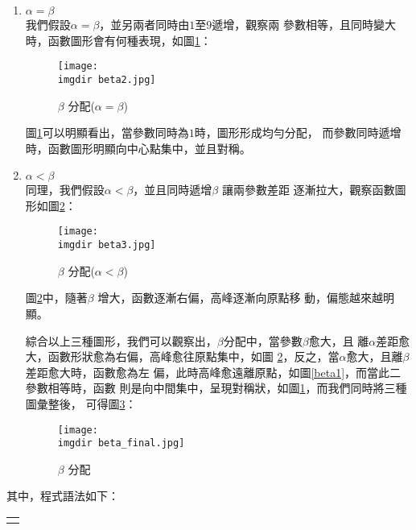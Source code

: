 \begin{enumerate}
{\begin{enumerate}
{\begin{figure}[H]
							\end{figure}
							由圖\ref{beta1}可觀察出，當$\beta$ 越趨近$\alpha$ 但同時不超過								$\alpha$ 時，分配中左偏傾向，會越來越不明顯，高峰逐漸向原點移動。					
						}
						\item{$\alpha = \beta$\\
							我們假設$\alpha = \beta$，並另兩者同時由$1$至$9$遞增，觀察兩								參數相等，且同時變大時，函數圖形會有何種表現，如圖\ref{beta2}：
							\begin{figure}[H]	
		 		 				\centering	 			 	 
   				 				\texttt{[image: \\imgdir beta2.jpg]} 
   			 					\caption{$\beta$ 分配($\alpha = \beta$)}   		
   			 					\label{beta2}   			 		 
							\end{figure}
							圖\ref{beta2}可以明顯看出，當參數同時為$1$時，圖形形成均勻分配，								而參數同時遞增時，函數圖形明顯向中心點集中，並且對稱。
						}
						\item{$\alpha < \beta$\\%
							同理，我們假設$\alpha < \beta$，並且同時遞增$\beta$ 讓兩參數差距								逐漸拉大，觀察函數圖形如圖\ref{beta3}：
							\begin{figure}[H]	
		 		 				\centering	 			 	 
   				 				\texttt{[image: \\imgdir beta3.jpg]} 
   			 					\caption{$\beta$ 分配($\alpha < \beta$)}   		
   			 					\label{beta3}   			 		 
							\end{figure}
							圖\ref{beta3}中，隨著$\beta$ 增大，函數逐漸右偏，高峰逐漸向原點移								動，偏態越來越明顯。		
						}		
						綜合以上三種圖形，我們可以觀察出，$\beta$分配中，當參數$\beta$愈大，且							離$\alpha$差距愈大，函數形狀愈為右偏，高峰愈往原點集中，如圖									\ref{beta3}，反之，當$\alpha$愈大，且離$\beta$差距愈大時，函數愈為左							偏，此時高峰愈遠離原點，如圖\ref{beta1}，而當此二參數相等時，函數								則是向中間集中，呈現對稱狀，如圖\ref{beta2}，而我們同時將三種圖彙整後，							可得圖\ref{beta_final}：
						\begin{figure}[H]	
		 		 				\centering	 			 	 
   				 				\texttt{[image: \\imgdir 												beta\_final.jpg]} 
   			 					\caption{$\beta$ 分配}   		
   			 					\label{beta_final}   			 		 
						\end{figure}										
					\end{enumerate}
					其中，程式語法如下：
					\begin{center}\colorbox{slight}{
						\begin{tabular}{p{}}
							\MJHmarker{\textbf{\color{darkblue}{MATLAB語法 :}}}\\

\end{tabular}}
\end{center}}
\end{enumerate}
